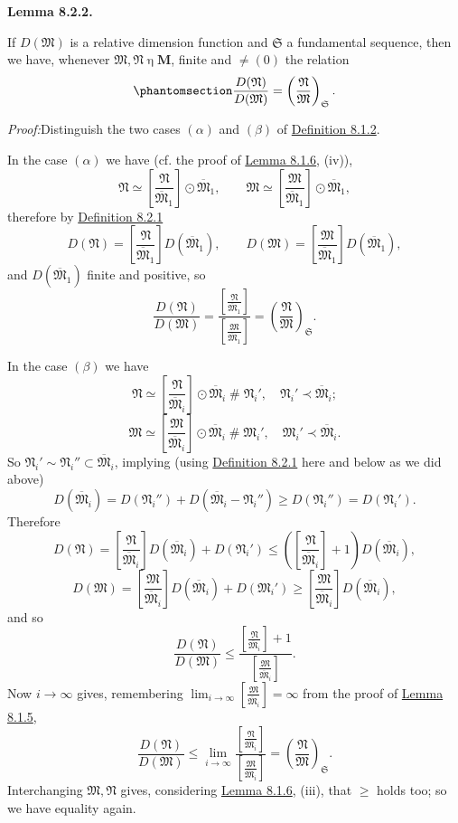 \documentclass[12pt,b5paper,twoside]{article}
\newcommand{\M}{\mathbf M}
\newcommand{\reldiv}[2]{\left[\frac{#1}{#2}\right]}
\newcommand{\Lemma}[1]{%
  \par\smallskip\noindent\phantomsection\label{lem:#1}\textbf{Lemma #1.}\enspace
}
\newcommand{\Proof}{\par\noindent\textit{Proof:}\enspace}
\newcommand{\defref}[1]{\hyperref[def:#1]{Definition #1}}
\newcommand{\lemref}[1]{\hyperref[lem:#1]{Lemma #1}}
\begin{document}
\Lemma{8.2.2}
If $D(\mathfrak M)$ is a relative dimension function and $\mathfrak S$ a
fundamental sequence, then we have, whenever
$\mathfrak M,\mathfrak N\mathbin\eta\M$, finite and $\ne(0)$ the relation
\begin{equation*}
 \phantomsection\label{eq:8.2.1}
 \frac{D(\mathfrak N)}{D(\mathfrak M)}
 =\left(\frac{\mathfrak N}{\mathfrak M}\right)_{\mathfrak S}.
\end{equation*}

\Proof Distinguish the two cases $(\alpha)$ and $(\beta)$ of \defref{8.1.2}.

In the case $(\alpha)$ we have (cf. the proof of \lemref{8.1.6}, (iv)),
\[
 \mathfrak N\simeq\reldiv{\mathfrak N}{\overline{\mathfrak M}_1}
 \odot\overline{\mathfrak M}_1,
 \qquad
 \mathfrak M\simeq\reldiv{\mathfrak M}{\overline{\mathfrak M}_1}
 \odot\overline{\mathfrak M}_1,
\]
therefore by \defref{8.2.1}
\[
 D(\mathfrak N)=\reldiv{\mathfrak N}{\overline{\mathfrak M}_1}
 D(\overline{\mathfrak M}_1),
 \qquad
 D(\mathfrak M)=\reldiv{\mathfrak M}{\overline{\mathfrak M}_1}
 D(\overline{\mathfrak M}_1),
\]
and $D(\overline{\mathfrak M}_1)$ finite and positive, so
\[
 \frac{D(\mathfrak N)}{D(\mathfrak M)}
 =\frac{\reldiv{\mathfrak N}{\overline{\mathfrak M}_1}}
       {\reldiv{\mathfrak M}{\overline{\mathfrak M}_1}}
 =\left(\frac{\mathfrak N}{\mathfrak M}\right)_{\mathfrak S}.
\]

In the case $(\beta)$ we have
\[
 \mathfrak N\simeq\reldiv{\mathfrak N}{\overline{\mathfrak M}_i}
 \odot\overline{\mathfrak M}_i\mathbin{\#}\mathfrak N_i',
 \quad \mathfrak N_i'\prec\overline{\mathfrak M}_i;
\]
\[
 \mathfrak M\simeq\reldiv{\mathfrak M}{\overline{\mathfrak M}_i}
 \odot\overline{\mathfrak M}_i\mathbin{\#}\mathfrak M_i',
 \quad \mathfrak M_i'\prec\overline{\mathfrak M}_i.
\]
So $\mathfrak N_i'\sim\mathfrak N_i''\subset\overline{\mathfrak M}_i$,
implying (using \defref{8.2.1} here and below as we did above)
\[
 D(\overline{\mathfrak M}_i)
 =D(\mathfrak N_i'')+D(\overline{\mathfrak M}_i-\mathfrak N_i'')
 \geq D(\mathfrak N_i'')=D(\mathfrak N_i').
\]
Therefore
\[
 D(\mathfrak N)
 =\reldiv{\mathfrak N}{\overline{\mathfrak M}_i}
   D(\overline{\mathfrak M}_i)+D(\mathfrak N_i')
 \leq\left(\reldiv{\mathfrak N}{\overline{\mathfrak M}_i}+1\right)
   D(\overline{\mathfrak M}_i),
\]
\[
 D(\mathfrak M)
 =\reldiv{\mathfrak M}{\overline{\mathfrak M}_i}
   D(\overline{\mathfrak M}_i)+D(\mathfrak M_i')
 \geq\reldiv{\mathfrak M}{\overline{\mathfrak M}_i}
   D(\overline{\mathfrak M}_i),
\]
and so
\[
 \frac{D(\mathfrak N)}{D(\mathfrak M)}
 \leq
 \frac{\reldiv{\mathfrak N}{\overline{\mathfrak M}_i}+1}
      {\reldiv{\mathfrak M}{\overline{\mathfrak M}_i}}.
\]
Now $i\to\infty$ gives, remembering
$\lim_{i\to\infty}\reldiv{\mathfrak M}{\overline{\mathfrak M}_i}=\infty$
from the proof of \lemref{8.1.5},
\[
 \frac{D(\mathfrak N)}{D(\mathfrak M)}
 \leq\lim_{i\to\infty}
 \frac{\reldiv{\mathfrak N}{\overline{\mathfrak M}_i}}
      {\reldiv{\mathfrak M}{\overline{\mathfrak M}_i}}
 =\left(\frac{\mathfrak N}{\mathfrak M}\right)_{\mathfrak S}.
\]
Interchanging $\mathfrak M,\mathfrak N$ gives, considering \lemref{8.1.6},
(iii), that $\geq$ holds too; so we have equality again.
\end{document}
